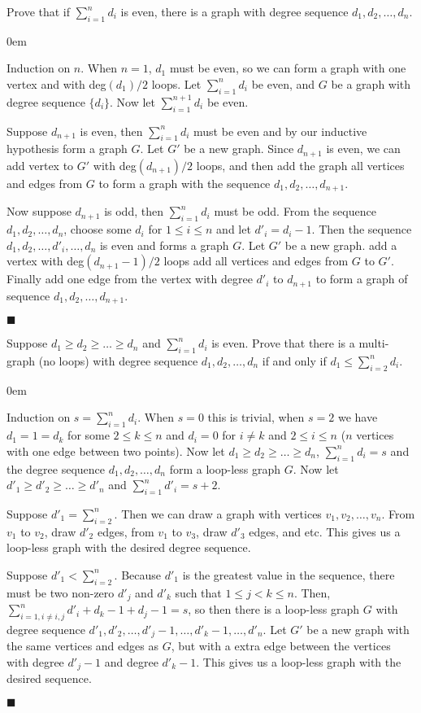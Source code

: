 \documentclass[12pt]{article}
\renewcommand{\qed}{\hfill$\blacksquare$}
\renewenvironment{proof}{\vspace{1em}\begin{addmargin}[2em]{0em}\begin{newproof}}{\end{newproof}\end{addmargin}\qed}
\newenvironment{exercise}[2][Exercise]{\begin{trivlist}
\item[\hskip \labelsep {\bfseries #1} \hskip \labelsep {\bfseries #2.}]}{\end{trivlist}}
\begin{document}
\begin{exercise} {5.1.2 (2pt)}
	Prove that if $\sum_{i=1}^n d_i$ is even, there is a graph with degree sequence $d_1,d_2,\ldots,d_n$.
\end{exercise}
\begin{proof}
	Induction on $n$. When $n=1$, $d_1$ must be even, so we can form a graph with one vertex and with deg$(d_1)/2$ loops. Let $\sum_{i=1}^n d_i$ be even, and $G$ be a graph with degree sequence $\{d_i\}$.  Now let $\sum_{i=1}^{n+1} d_i$ be even.

	Suppose $d_{n+1}$ is even, then $\sum_{i=1}^n d_i$ must be even and by our inductive hypothesis form a graph $G$. Let $G'$ be a new graph. Since $d_{n+1}$ is even, we can add vertex to $G'$ with deg$(d_{n+1})/2$ loops, and then add the graph all vertices and edges from $G$ to form a graph with the sequence $d_1,d_2,\ldots,d_{n+1}$.

	Now suppose $d_{n+1}$ is odd, then $\sum_{i=1}^n d_{i}$ must be odd. From the sequence $d_1, d_2, \ldots, d_n$, choose some $d_i$ for $1 \le i \le n$ and let $d'_i = d_i - 1$. Then the sequence $d_1, d_2, \ldots,d'_i,\ldots,d_n$ is even and forms a graph $G$. Let $G'$ be a new graph. add a vertex with deg$(d_{n+1} - 1)/2$ loops add all vertices and edges from $G$ to $G'$. Finally add one edge from the vertex with degree $d'_i$ to $d_{n+1}$ to form a graph of sequence $d_1,d_2,\ldots,d_{n+1}$.
\end{proof}
\begin{exercise} {5.1.3 (2pt)}
	Suppose $d_1 \ge d_2 \ge \ldots \ge d_n$ and $\sum_{i=1}^n d_i$ is even. Prove that there is a multi-graph (no loops) with degree sequence $d_1,d_2,\ldots,d_n$ if and only if $d_1 \le \sum_{i=2}^n d_i$.
\end{exercise}
\begin{proof}
	Induction on $s = \sum_{i=1}^n d_i$. When $s = 0$ this is trivial, when $s = 2$ we have $d_1 = 1 = d_k$ for some $2 \le k \le n$ and $d_i = 0$ for $i \neq k$ and $2 \le i \le n$ ($n$ vertices with one edge between two points). Now let $d_1 \ge d_2 \ge \ldots \ge d_n$, $\sum_{i=1}^n d_i = s$ and the degree sequence $d_1,d_2,\ldots,d_n$ form a loop-less graph $G$. Now let $d'_{1} \ge d'_{2} \ge \ldots \ge d'_n$ and $\sum_{i=1}^n d'_i = s + 2$.

	Suppose $d'_1 = \sum_{i=2}^n$. Then we can draw a graph with vertices $v_1,v_2,\ldots,v_n$. From $v_1$ to $v_2$, draw $d'_2$ edges, from $v_1$ to $v_3$, draw $d'_3$ edges, and etc. This gives us a loop-less graph with the desired degree sequence.

	Suppose $d'_1 < \sum_{i=2}^n$. Because $d'_1$ is the greatest value in the sequence, there must be two non-zero $d'_j$ and $d'_k$ such that $1 \le j < k \le n$. Then, $\sum_{i=1,i\neq i,j}^n d'_i + d_k - 1 + d_j - 1 = s$, so then there is a loop-less graph $G$ with degree sequence $d'_1,d'_2,\ldots,d'_j - 1,\ldots,d'_k-1,\ldots,d'_n$. Let $G'$ be a new graph with the same vertices and edges as $G$, but with a extra edge between the vertices with degree $d'_j - 1$ and degree $d'_k - 1$. This gives us a loop-less graph with the desired sequence.
\end{proof}
\end{document}
